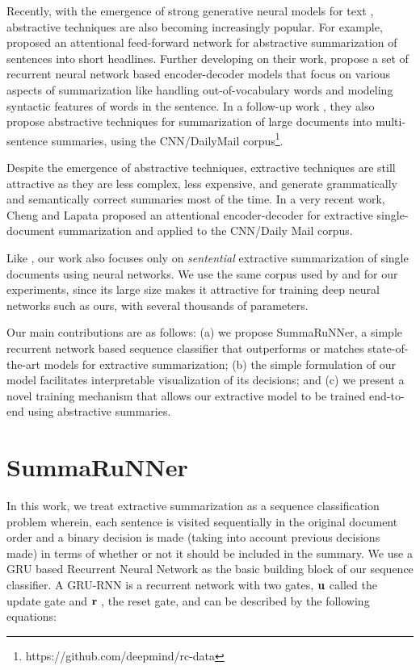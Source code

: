 \documentclass[letterpaper]{article}
\begin{document}
Recently, with the emergence of strong generative neural models for text \cite{bahdanau:14}, abstractive techniques are also becoming increasingly popular. For example, \cite{rush:15} proposed an attentional feed-forward network for abstractive summarization of sentences into short headlines. Further developing on their work, \cite{nallapati} propose a set of recurrent neural network based encoder-decoder models that focus on various aspects of summarization like handling out-of-vocabulary words and modeling syntactic features of words in the sentence. In a follow-up work \cite{nallapati_conll}, they also propose abstractive techniques for summarization of large documents into multi-sentence summaries, using the CNN/DailyMail corpus\footnote{https://github.com/deepmind/rc-data}.

Despite the emergence of abstractive techniques, extractive techniques are still attractive as they are less complex, less expensive, and generate grammatically and semantically correct summaries most of the time. In a very recent work, Cheng and Lapata  proposed an attentional encoder-decoder for extractive single-document summarization and applied to the CNN/Daily Mail corpus.  


Like \cite{jianpeng}, our work also focuses only on {\it sentential} extractive summarization of single documents using neural networks. We use the same corpus used by \cite{nallapati_conll} and \cite{jianpeng} for our experiments, since its large size makes it attractive for training deep neural networks such as ours, with several thousands of parameters. 

Our main contributions are as follows: (a) we propose SummaRuNNer, a simple recurrent network based sequence classifier that outperforms or matches state-of-the-art models for extractive summarization; (b) the simple formulation of our model facilitates interpretable visualization of its decisions; and (c) we present a novel training mechanism that allows our extractive model to be trained end-to-end using abstractive summaries.  


\section{SummaRuNNer}
In this work, we treat extractive summarization as a sequence classification problem wherein, each sentence is visited sequentially in the original document order and a binary decision is made (taking into account previous decisions made) in terms of whether or not it should be included in the summary. We use a GRU based Recurrent Neural Network \cite{gru_rnn} as the basic building block of our sequence classifier. A GRU-RNN is a recurrent network with two gates, ${\bf u}$ called the update gate and ${\bf r}$ , the reset gate, and can be described by the following equations:
\end{document}
